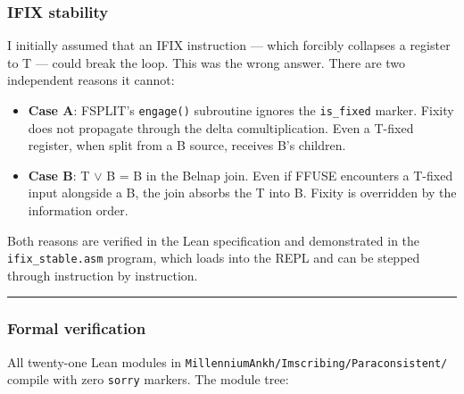 \documentclass[12pt,a4paper]{article}
\begin{document}
\subsubsection{IFIX stability}

I initially assumed that an IFIX instruction --- which forcibly collapses a register to T --- could break the loop. This was the wrong answer. There are two independent reasons it cannot:

\begin{itemize}
    \item \textbf{Case A}: FSPLIT's \texttt{engage()} subroutine ignores the \texttt{is\_fixed} marker. Fixity does not propagate through the delta comultiplication. Even a T-fixed register, when split from a B source, receives B's children.
    \item \textbf{Case B}: T $\lor$ B = B in the Belnap join. Even if FFUSE encounters a T-fixed input alongside a B, the join absorbs the T into B. Fixity is overridden by the information order.
\end{itemize}

Both reasons are verified in the Lean specification and demonstrated in the \texttt{ifix\_stable.asm} program, which loads into the REPL and can be stepped through instruction by instruction.

\begin{center}
\rule{0.5\textwidth}{0.4pt}
\end{center}

\subsubsection{Formal verification}

All twenty-one Lean modules in \texttt{MillenniumAnkh/Imscribing/Paraconsistent/} compile with zero \texttt{sorry} markers. The module tree:
\end{document}

